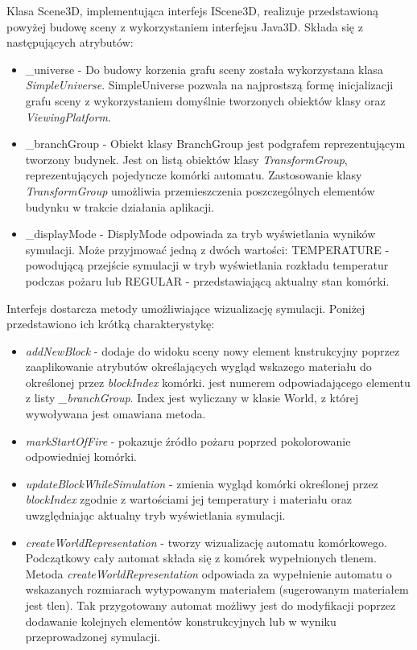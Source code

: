 Klasa Scene3D, implementująca interfejs IScene3D, realizuje przedstawioną powyżej budowę sceny z wykorzystaniem interfejsu Java3D.
Składa się z następujących atrybutów:
\begin{itemize}
\item \_universe - Do budowy korzenia grafu sceny została wykorzystana klasa \textit{SimpleUniverse}. SimpleUniverse pozwala na najprostszą formę inicjalizacji grafu sceny z wykorzystaniem domyślnie tworzonych obiektów klasy  oraz \textit{ViewingPlatform}. 
\item \_branchGroup - Obiekt klasy BranchGroup jest podgrafem reprezentującym tworzony budynek. Jest on listą obiektów klasy \textit{TransformGroup}, reprezentujących pojedyncze komórki automatu. Zastosowanie klasy \textit{TransformGroup} umożliwia przemieszczenia poszczególnych
elementów budynku w trakcie działania aplikacji.
\item \_displayMode - DisplyMode odpowiada za tryb wyświetlania wyników symulacji. Może przyjmować jedną z dwóch wartości: TEMPERATURE - powodującą przejście symulacji w tryb wyświetlania rozkładu temperatur podczas pożaru lub REGULAR - przedstawiającą aktualny stan komórki.
\end{itemize}
Interfejs  dostarcza metody umożliwiające wizualizację symulacji. Poniżej przedstawiono ich krótką charakterystykę:
\begin{itemize}
\item \textit{addNewBlock} - dodaje do widoku sceny nowy element knstrukcyjny poprzez zaaplikowanie atrybutów określających wygląd wskazego materiału do określonej przez \textit{blockIndex} komórki.  jest numerem odpowiadającego elementu z listy \textit{\_branchGroup}. Index jest wyliczany w klasie World, z której wywoływana jest omawiana metoda.
\item \textit{markStartOfFire} - pokazuje źródło pożaru poprzed pokolorowanie odpowiedniej komórki.
\item \textit{updateBlockWhileSimulation} - zmienia wygląd komórki określonej przez \textit{blockIndex} zgodnie z wartościami jej temperatury i materiału oraz uwzględniając aktualny tryb wyświetlania symulacji.
\item \textit{createWorldRepresentation} - tworzy wizualizację automatu komórkowego. Podczątkowy cały automat składa się z komórek wypełnionych tlenem. Metoda \textit{createWorldRepresentation} odpowiada za wypełnienie automatu o wskazanych rozmiarach wytypowanym materiałem (sugerowanym materiałem jest tlen). Tak przygotowany automat możliwy jest do modyfikacji poprzez dodawanie kolejnych elementów konstrukcyjnych lub w wyniku przeprowadzonej symulacji.
\end{itemize}

